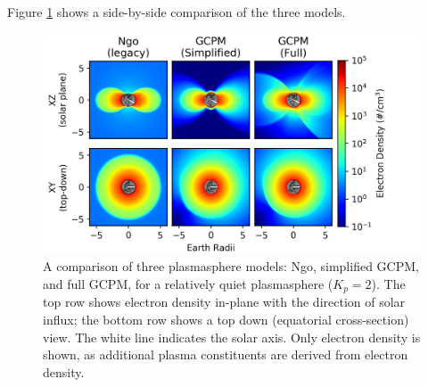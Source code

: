 Figure \ref{fig:plasma_model_comparison} shows a side-by-side comparison of the three models.
\begin{figure}[h]
\begin{center}
\includegraphics{figures/plasma_model_comparison.png}
\caption{A comparison of three plasmasphere models: Ngo, simplified GCPM, and full GCPM, for a relatively quiet plasmasphere ($K_p=2$). The top row shows electron density in-plane with the direction of solar influx; the bottom row shows a top down (equatorial cross-section) view. The white line indicates the solar axis. Only electron density is shown, as additional plasma constituents are derived from electron density.}
\label{fig:plasma_model_comparison}
\end{center}
\end{figure}